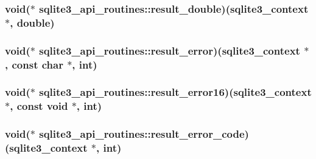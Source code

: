 \hypertarget{structsqlite3__api__routines_a2a30d668aa648384ab1058cf77924c33}{
\subsubsection[{result\-\_\-double}]{\setlength{\rightskip}{0pt plus 5cm}void($\ast$ sqlite3\-\_\-api\-\_\-routines\-::result\-\_\-double)({\bf sqlite3\-\_\-context} $\ast$, double)}}\label{structsqlite3__api__routines_a2a30d668aa648384ab1058cf77924c33}
\hypertarget{structsqlite3__api__routines_aa056e7b903ab75742336977a511ef14c}{
\subsubsection[{result\-\_\-error}]{\setlength{\rightskip}{0pt plus 5cm}void($\ast$ sqlite3\-\_\-api\-\_\-routines\-::result\-\_\-error)({\bf sqlite3\-\_\-context} $\ast$, const char $\ast$, int)}}\label{structsqlite3__api__routines_aa056e7b903ab75742336977a511ef14c}
\hypertarget{structsqlite3__api__routines_a70665eda481c4fcafdfd1462700be04e}{
\subsubsection[{result\-\_\-error16}]{\setlength{\rightskip}{0pt plus 5cm}void($\ast$ sqlite3\-\_\-api\-\_\-routines\-::result\-\_\-error16)({\bf sqlite3\-\_\-context} $\ast$, const void $\ast$, int)}}\label{structsqlite3__api__routines_a70665eda481c4fcafdfd1462700be04e}
\hypertarget{structsqlite3__api__routines_a9c1248e6ec11a77ea298a0d3b9f3bbe6}{
\subsubsection[{result\-\_\-error\-\_\-code}]{\setlength{\rightskip}{0pt plus 5cm}void($\ast$ sqlite3\-\_\-api\-\_\-routines\-::result\-\_\-error\-\_\-code)({\bf sqlite3\-\_\-context} $\ast$, int)}}\label{structsqlite3__api__routines_a9c1248e6ec11a77ea298a0d3b9f3bbe6}
